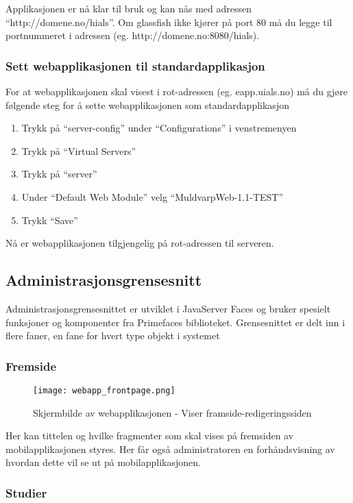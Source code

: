 \documentclass[../main.tex]{subfiles}
\begin{document}
Applikasjonen er nå klar til bruk og kan nås med adressen “http://domene.no/hials”. Om glassfish ikke kjører på port 80 må du legge til portnummeret i adressen (eg. http://domene.no:8080/hials).

\subsubsection{Sett webapplikasjonen til standardapplikasjon}

For at webapplikasjonen skal visest i rot-adressen (eg. eapp.uials.no) må du gjøre følgende steg for å sette webapplikasjonen som standardapplikasjon

\begin{enumerate}
\item Trykk på “server-config” under “Configurations” i venstremenyen
\item Trykk på “Virtual Servers”
\item Trykk på “server”
\item Under “Default Web Module” velg “MuldvarpWeb-1.1-TEST”
\item Trykk “Save”
\end{enumerate}
Nå er webapplikasjonen tilgjengelig på rot-adressen til serveren.

\subsection{Administrasjonsgrensesnitt}

Administrasjonsgrensesnittet er utviklet i JavaServer Faces og bruker spesielt funksjoner og komponenter fra Primefaces biblioteket. Grensesnittet er delt inn i flere faner, en fane for hvert type objekt i systemet

\subsubsection{Fremside}

\begin{figure}[H]
  \centering
  \texttt{[image: webapp\_frontpage.png]}
  \caption{Skjermbilde av webapplikasjonen - Viser framside-redigeringssiden}
\end{figure}

Her kan tittelen og hvilke fragmenter som skal vises på fremsiden av mobilapplikasjonen styres. Her får også administratoren en forhåndsvisning av hvordan dette vil se ut på mobilapplikasjonen.

\subsubsection{Studier}
\end{document}
